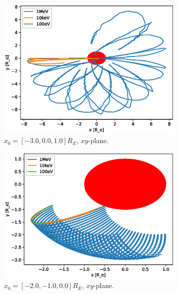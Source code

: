 \begin{figure}
    \begin{subfigure}[h]{0.45\textwidth}
        \includegraphics[width=\textwidth]{Figures/Trajectories/trajectories-xy-56.eps}
        \caption{$x_0 = [-3.0,0.0,1.0]R_E$, $xy$-plane.}
        \label{fig:traj-a}
    \end{subfigure}
    \hfill
    \begin{subfigure}[h]{0.45\textwidth}
        \includegraphics[width=\textwidth]{Figures/Trajectories/trajectories-xy-11.eps}
        \caption{$x_0 = [-2.0,-1.0,0.0]R_E$, $xy$-plane.}
        \label{fig:traj-b}
    \end{subfigure}
    \vfill
    \begin{subfigure}[h]{0.45\textwidth}

\end{subfigure}
\end{figure}

